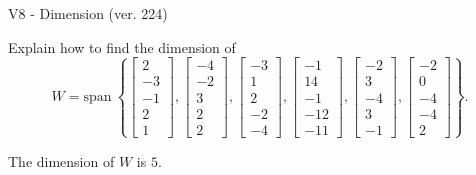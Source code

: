 \begin{exercise}
  \begin{exerciseTitle}V8 - Dimension (ver. 224)\end{exerciseTitle}
  \begin{exerciseStatement}
    Explain how to find the dimension of 
\[W=\mathrm{span}\ \left\{\left[\begin{array}{r}
2 \\
-3 \\
-1 \\
2 \\
1
\end{array}\right] , \left[\begin{array}{r}
-4 \\
-2 \\
3 \\
2 \\
2
\end{array}\right] , \left[\begin{array}{r}
-3 \\
1 \\
2 \\
-2 \\
-4
\end{array}\right] , \left[\begin{array}{r}
-1 \\
14 \\
-1 \\
-12 \\
-11
\end{array}\right] , \left[\begin{array}{r}
-2 \\
3 \\
-4 \\
3 \\
-1
\end{array}\right] , \left[\begin{array}{r}
-2 \\
0 \\
-4 \\
-4 \\
2
\end{array}\right]\right\}.\]



  \end{exerciseStatement}
  \begin{exerciseAnswer}
   The dimension of \(W\) is  \(5\).
  


  \end{exerciseAnswer}
\end{exercise}